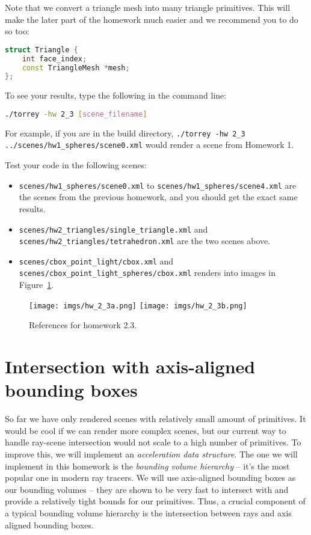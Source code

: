Note that we convert a triangle mesh into many triangle primitives. This will make the later part of the homework much easier and we recommend you to do so too:
\begin{lstlisting}[language=C++]
struct Triangle {
    int face_index;
    const TriangleMesh *mesh;
};
\end{lstlisting}

To see your results, type the following in the command line:
\begin{lstlisting}[language=bash]
./torrey -hw 2_3 [scene_filename]
\end{lstlisting}
For example, if you are in the build directory, \lstinline{./torrey -hw 2_3 ../scenes/hw1_spheres/scene0.xml} would render a scene from Homework 1.

Test your code in the following scenes: 
\begin{itemize}
  \item \lstinline{scenes/hw1_spheres/scene0.xml} to \lstinline{scenes/hw1_spheres/scene4.xml} are the scenes from the previous homework, and you should get the exact same results. 
  \item \lstinline{scenes/hw2_triangles/single_triangle.xml} and \lstinline{scenes/hw2_triangles/tetrahedron.xml} are the two scenes above.
  \item \lstinline{scenes/cbox_point_light/cbox.xml} and \lstinline{scenes/cbox_point_light_spheres/cbox.xml} renders into images in Figure~\ref{fig:hw_2_3}.
\end{itemize}

\begin{figure}[ht]
    \centering
    \texttt{[image: imgs/hw\_2\_3a.png]}
    \texttt{[image: imgs/hw\_2\_3b.png]}
    \caption{References for homework 2.3.}
    \label{fig:hw_2_3}
\end{figure}

\section{Intersection with axis-aligned bounding boxes}
So far we have only rendered scenes with relatively small amount of primitives. It would be cool if we can render more complex scenes, but our current way to handle ray-scene intersection would not scale to a high number of primitives. To improve this, we will implement an \emph{acceleration data structure}. The one we will implement in this homework is the \emph{bounding volume hierarchy} -- it's the most popular one in  modern ray tracers. We will use axis-aligned bounding boxes as our bounding volumes -- they are shown to be very fast to intersect with and provide a relatively tight bounds for our primitives. Thus, a crucial component of a typical bounding volume hierarchy is the intersection between rays and axis aligned bounding boxes. 

